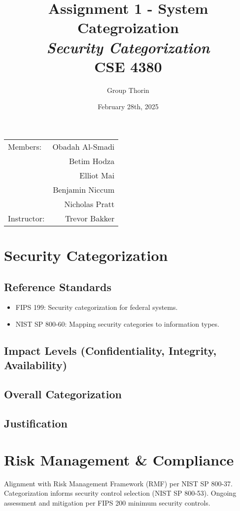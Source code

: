 \documentclass{article}
\title{Assignment 1 - System Categroization \\ \textit{Security Categorization}\\ CSE 4380}
\author{Group Thorin}
\date{February 28th, 2025}
\begin{document}
\maketitle
\begin{center}
\begin{tabular}{l r}

Members: 	& Obadah Al-Smadi\\
			& Betim Hodza\\
			& Elliot Mai\\
			& Benjamin Niccum\\
        	& Nicholas Pratt\\
Instructor: & Trevor Bakker\end{tabular}
\end{center}

\newpage

\setcounter{tocdepth}{2}
\tableofcontents
\newpage

\listoffigures
\listoftables
\newpage

\section{Security Categorization}

\subsection{Reference Standards}
\begin{itemize}
    \item FIPS 199: Security categorization for federal systems.
    \item NIST SP 800-60: Mapping security categories to information types.
\end{itemize}

\subsection{Impact Levels (Confidentiality, Integrity, Availability)}


\subsection{Overall Categorization}

\subsection{Justification}

\newpage

\section{Risk Management \& Compliance}

Alignment with Risk Management Framework (RMF) per NIST SP 800-37. Categorization informs security control selection (NIST SP 800-53). Ongoing assessment and mitigation per FIPS 200 minimum security controls.
\end{document}
